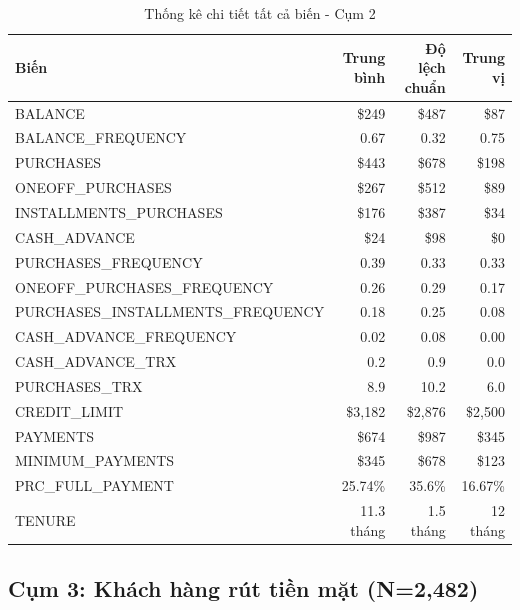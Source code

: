 \begin{table}[H]
\centering
\caption{Thống kê chi tiết tất cả biến - Cụm 2}
\small
\begin{tabular}{|l|r|r|r|}
\hline
\textbf{Biến} & \textbf{Trung bình} & \textbf{Độ lệch chuẩn} & \textbf{Trung vị} \\
\hline
BALANCE & \$249 & \$487 & \$87 \\
\hline
BALANCE\_FREQUENCY & 0.67 & 0.32 & 0.75 \\
\hline
PURCHASES & \$443 & \$678 & \$198 \\
\hline
ONEOFF\_PURCHASES & \$267 & \$512 & \$89 \\
\hline
INSTALLMENTS\_PURCHASES & \$176 & \$387 & \$34 \\
\hline
CASH\_ADVANCE & \$24 & \$98 & \$0 \\
\hline
PURCHASES\_FREQUENCY & 0.39 & 0.33 & 0.33 \\
\hline
ONEOFF\_PURCHASES\_FREQUENCY & 0.26 & 0.29 & 0.17 \\
\hline
PURCHASES\_INSTALLMENTS\_FREQUENCY & 0.18 & 0.25 & 0.08 \\
\hline
CASH\_ADVANCE\_FREQUENCY & 0.02 & 0.08 & 0.00 \\
\hline
CASH\_ADVANCE\_TRX & 0.2 & 0.9 & 0.0 \\
\hline
PURCHASES\_TRX & 8.9 & 10.2 & 6.0 \\
\hline
CREDIT\_LIMIT & \$3,182 & \$2,876 & \$2,500 \\
\hline
PAYMENTS & \$674 & \$987 & \$345 \\
\hline
MINIMUM\_PAYMENTS & \$345 & \$678 & \$123 \\
\hline
PRC\_FULL\_PAYMENT & 25.74\% & 35.6\% & 16.67\% \\
\hline
TENURE & 11.3 tháng & 1.5 tháng & 12 tháng \\
\hline
\end{tabular}
\end{table}

\subsection{Cụm 3: Khách hàng rút tiền mặt (N=2,482)}

